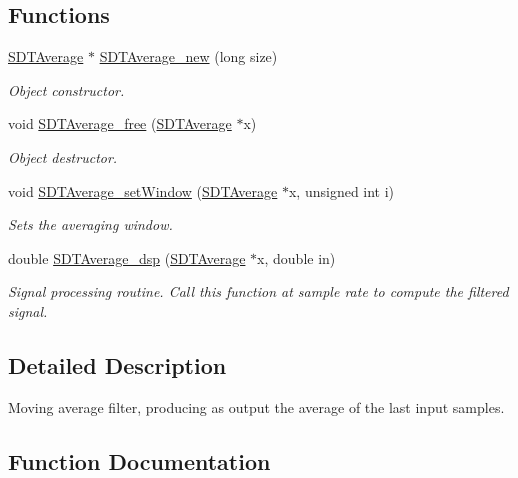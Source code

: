 \subsection*{Functions}
\begin{DoxyCompactItemize}
\item 
\hyperlink{group__average_ga59d09dcb18c4d483a1577d87ad90d1c3}{S\+D\+T\+Average} $\ast$ \hyperlink{group__average_ga561a3d79fca7959e8e185a323beb2551}{S\+D\+T\+Average\+\_\+new} (long size)
\begin{DoxyCompactList}\small\item\em Object constructor. \end{DoxyCompactList}\item 
void \hyperlink{group__average_ga53871e87b5c502963e39f29cab8bb8cd}{S\+D\+T\+Average\+\_\+free} (\hyperlink{group__average_ga59d09dcb18c4d483a1577d87ad90d1c3}{S\+D\+T\+Average} $\ast$x)
\begin{DoxyCompactList}\small\item\em Object destructor. \end{DoxyCompactList}\item 
void \hyperlink{group__average_ga2fc1886e89f08ebfbe21281c6ee4f091}{S\+D\+T\+Average\+\_\+set\+Window} (\hyperlink{group__average_ga59d09dcb18c4d483a1577d87ad90d1c3}{S\+D\+T\+Average} $\ast$x, unsigned int i)
\begin{DoxyCompactList}\small\item\em Sets the averaging window. \end{DoxyCompactList}\item 
double \hyperlink{group__average_gae1164660f6d50d9f193b6e7dad522961}{S\+D\+T\+Average\+\_\+dsp} (\hyperlink{group__average_ga59d09dcb18c4d483a1577d87ad90d1c3}{S\+D\+T\+Average} $\ast$x, double in)
\begin{DoxyCompactList}\small\item\em Signal processing routine. Call this function at sample rate to compute the filtered signal. \end{DoxyCompactList}\end{DoxyCompactItemize}


\subsection{Detailed Description}
Moving average filter, producing as output the average of the last input samples. 

\subsection{Function Documentation}
\hypertarget{group__average_gae1164660f6d50d9f193b6e7dad522961}{}
